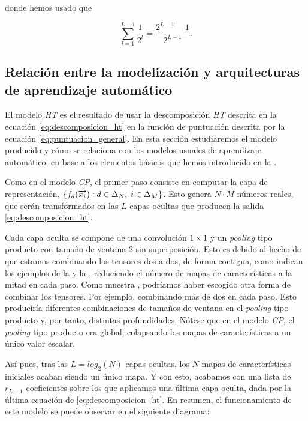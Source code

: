 donde hemos usado que

\begin{equation}
	\sum_{l = 1}^{L-1} \frac{1}{2^l} = \frac{2^{L-1} - 1}{2^{L-1}}.
\end{equation}

\subsection{Relación entre la modelización y arquitecturas de aprendizaje automático}

El modelo \textit{HT} es el resultado de usar la descomposición \textit{HT} descrita en la ecuación \eqref{eq:descomposicion_ht} en la función de puntuación descrita por la ecuación \eqref{eq:puntuacion_general}. En esta sección estudiaremos el modelo producido y cómo se relaciona con los modelos usuales de aprendizaje automático, en base a los elementos básicos que hemos introducido en la .

Como en el modelo \textit{CP}, el primer paso consiste en computar la capa de representación, $\{f_d(\overrightarrow{x_i}): d \in \Delta_{N}, \; i \in \Delta_{M}\}$. Esto genera $N \cdot M$ números reales, que serán transformados en las $L$ capas ocultas que producen la salida \eqref{eq:descomposicion_ht}.

Cada capa oculta se compone de una convolución $1 \times 1$ y un \textit{pooling} tipo producto con tamaño de ventana 2 sin superposición.  Esto es debido al hecho de que estamos combinando los tensores dos a dos, de forma contigua, como indican los ejemplos de la  y la , reduciendo el número de mapas de características a la mitad en cada paso. Como muestra \cite{matematicas:descomposicion_ht}, podríamos haber escogido otra forma de combinar los tensores. Por ejemplo, combinando más de dos en cada paso. Esto produciría diferentes combinaciones de tamaños de ventana en el \textit{pooling} tipo producto y, por tanto, distintas profundidades. Nótese que en el modelo \textit{CP}, el \textit{pooling} tipo producto era global, colapsando los mapas de características a un único valor escalar.

Así pues, tras las $L = log_2(N)$ capas ocultas, los $N$ mapas de características iniciales acaban siendo un único mapa. Y con esto, acabamos con una lista de $r_{L - 1}$ coeficientes sobre los que aplicamos una última capa oculta, dada por la última ecuación de \eqref{eq:descomposicion_ht}. En resumen, el funcionamiento de este modelo se puede observar en el siguiente diagrama:

